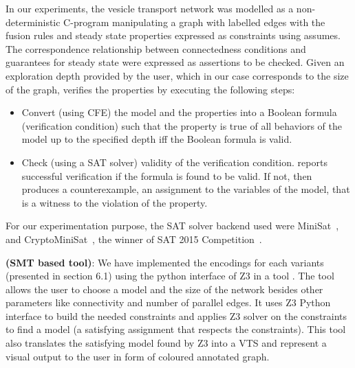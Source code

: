 In our experiments, the vesicle transport network was modelled as a non-deterministic C-program manipulating a graph with labelled edges with the fusion rules and steady state properties expressed as constraints using assumes. 
%		
The correspondence relationship between connectedness conditions
and guarantees for steady state were expressed as assertions to be checked. 
%		
Given an exploration depth provided by the user, which in our case corresponds to the size of the graph, {\sattool} verifies the properties by executing the following steps:
	\begin{itemize}
	\item Convert (using CFE) the model and the properties into a Boolean formula (verification condition) such that the property is true of all behaviors of the model up to the specified
depth iff the Boolean formula is valid.
	\item Check (using a SAT solver) validity of the verification condition. {\sattool} reports successful verification if the formula is found to be valid. If not, then {\sattool} produces a counterexample,
an assignment to the variables of the model, that is a witness to the violation of the property.
	\end{itemize}
For our experimentation purpose, the SAT solver backend used were MiniSat~\cite{sorensson2005minisat}, and CryptoMiniSat~\cite{soos2016cryptominisat}, the winner of SAT 2015 Competition~\cite{balyo2016sat}. 


\textbf{{\smttool} (SMT based tool)}:
	We have implemented the encodings for each variants (presented in section 6.1) using the python interface of Z3 in a tool {\smttool}. 
%
The tool allows the user to choose a model and the size
of the network besides other parameters like connectivity and number of parallel edges. 
%		
It uses Z3 Python interface to build the needed constraints and applies Z3 solver on the constraints to find a model (a satisfying assignment that respects the constraints). 
%
This tool also translates the satisfying model found by Z3 into
a VTS and represent a visual output to the user in form of coloured annotated graph. 
%
%
 

